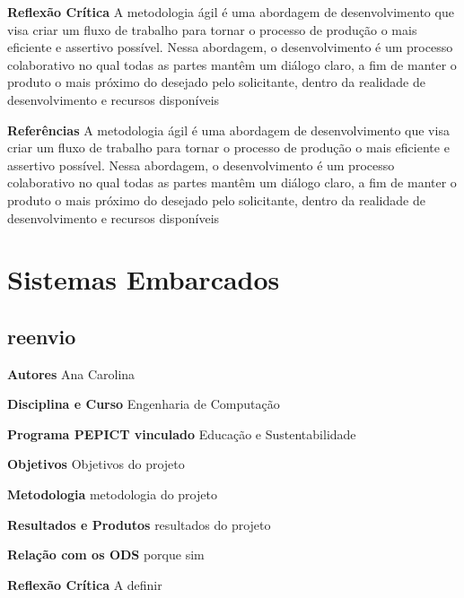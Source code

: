 \documentclass[12pt,openright,oneside,a4paper]{report}
\begin{document}
\vspace{0.7cm}
\noindent
\textbf{Reflexão Crítica}
A metodologia ágil é uma abordagem de desenvolvimento que visa criar um fluxo de trabalho para tornar o processo de produção o mais eficiente e assertivo possível. Nessa abordagem, o desenvolvimento é um processo colaborativo no qual todas as partes mantêm um diálogo claro, a fim de manter o produto o mais próximo do desejado pelo solicitante, dentro da realidade de desenvolvimento e recursos disponíveis

\vspace{0.7cm}
\noindent
\textbf{Referências}
A metodologia ágil é uma abordagem de desenvolvimento que visa criar um fluxo de trabalho para tornar o processo de produção o mais eficiente e assertivo possível. Nessa abordagem, o desenvolvimento é um processo colaborativo no qual todas as partes mantêm um diálogo claro, a fim de manter o produto o mais próximo do desejado pelo solicitante, dentro da realidade de desenvolvimento e recursos disponíveis

\vspace{0.7cm}
\chapter{Sistemas Embarcados}

\newpage
\section{reenvio}
\noindent
\textbf{Autores}
Ana Carolina

\vspace{0.7cm}
\noindent
\textbf{Disciplina e Curso}
Engenharia de Computação

\vspace{0.7cm}
\noindent
\textbf{Programa PEPICT vinculado}
Educação e Sustentabilidade

\vspace{0.7cm}
\noindent
\textbf{Objetivos}
Objetivos do projeto

\vspace{0.7cm}
\noindent
\textbf{Metodologia}
metodologia do projeto

\vspace{0.7cm}
\noindent
\textbf{Resultados e Produtos}
resultados do projeto

\vspace{0.7cm}
\noindent
\textbf{Relação com os ODS}
porque sim

\vspace{0.7cm}
\noindent
\textbf{Reflexão Crítica}
A definir
\end{document}
